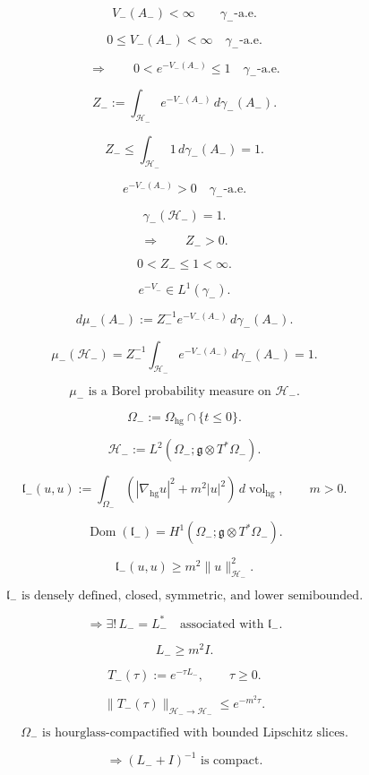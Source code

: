 \documentclass[11pt]{article}
\begin{document}
\[
\boxed{
V_-(A_-)<\infty
\qquad
\gamma_-\text{-a.e.}
}
\]

\[
0\le V_-(A_-)<\infty
\quad
\gamma_-\text{-a.e.}
\]

\[
\Longrightarrow
\qquad
0<e^{-V_-(A_-)}\le1
\quad
\gamma_-\text{-a.e.}
\]

\[
Z_-
:=
\int_{\mathcal H_-}e^{-V_-(A_-)}\,d\gamma_-(A_-).
\]

\[
Z_-
\le
\int_{\mathcal H_-}1\,d\gamma_-(A_-)
=
1.
\]

\[
e^{-V_-(A_-)}>0
\quad
\gamma_-\text{-a.e.}
\]

\[
\gamma_-(\mathcal H_-)=1.
\]

\[
\Longrightarrow
\qquad
Z_->0.
\]

\[
\boxed{
0<Z_-\le1<\infty.
}
\]

\[
\boxed{
e^{-V_-}\in L^1(\gamma_-).
}
\]

\[
d\mu_-(A_-)
:=
Z_-^{-1}e^{-V_-(A_-)}\,d\gamma_-(A_-).
\]

\[
\mu_-(\mathcal H_-)
=
Z_-^{-1}
\int_{\mathcal H_-}e^{-V_-(A_-)}\,d\gamma_-(A_-)
=
1.
\]

\[
\boxed{
\mu_-
\text{ is a Borel probability measure on }\mathcal H_-.
}
\]

\[
\Omega_-
:=
\Omega_{\mathrm{hg}}\cap\{t\le 0\}.
\]

\[
\mathcal H_-
:=
L^2(\Omega_-;\mathfrak g\otimes T^\ast\Omega_-).
\]

\[
\mathfrak l_-(u,u)
:=
\int_{\Omega_-}
\left(
|\nabla_{\mathrm{hg}}u|^2
+
m^2|u|^2
\right)\,d\operatorname{vol}_{\mathrm{hg}},
\qquad
m>0.
\]

\[
\operatorname{Dom}(\mathfrak l_-)
=
H^1(\Omega_-;\mathfrak g\otimes T^\ast\Omega_-).
\]

\[
\mathfrak l_-(u,u)
\ge
m^2\|u\|_{\mathcal H_-}^2.
\]

\[
\mathfrak l_-
\text{ is densely defined, closed, symmetric, and lower semibounded}.
\]

\[
\Longrightarrow
\exists!\,
L_-=L_-^\ast
\quad
\text{associated with }\mathfrak l_-.
\]

\[
L_-\ge m^2I.
\]

\[
T_-(\tau)
:=
e^{-\tau L_-},
\qquad
\tau\ge0.
\]

\[
\|T_-(\tau)\|_{\mathcal H_-\to\mathcal H_-}
\le
e^{-m^2\tau}.
\]

\[
\Omega_-
\text{ is hourglass-compactified with bounded Lipschitz slices}.
\]

\[
\Longrightarrow
(L_-+I)^{-1}
\text{ is compact}.
\]
\end{document}
